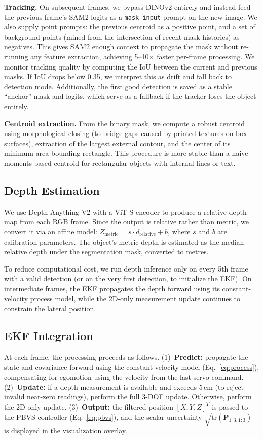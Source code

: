 \documentclass[letterpaper, 10 pt, conference]{ieeeconf}  %
\begin{document}
\textbf{Tracking.}
On subsequent frames, we bypass DINOv2 entirely and instead feed the previous frame's SAM2 logits as a \texttt{mask\_input} prompt on the new image. We also supply point prompts: the previous centroid as a positive point, and a set of background points (mined from the intersection of recent mask histories) as negatives. This gives SAM2 enough context to propagate the mask without re-running any feature extraction, achieving 5--10$\times$ faster per-frame processing. We monitor tracking quality by computing the IoU between the current and previous masks. If IoU drops below 0.35, we interpret this as drift and fall back to detection mode. Additionally, the first good detection is saved as a stable ``anchor'' mask and logits, which serve as a fallback if the tracker loses the object entirely.

\textbf{Centroid extraction.}
From the binary mask, we compute a robust centroid using morphological closing (to bridge gaps caused by printed textures on box surfaces), extraction of the largest external contour, and the center of its minimum-area bounding rectangle. This procedure is more stable than a naive moments-based centroid for rectangular objects with internal lines or text.

\subsection{Depth Estimation}

We use Depth Anything V2 with a ViT-S encoder to produce a relative depth map from each RGB frame. Since the output is relative rather than metric, we convert it via an affine model: $Z_{\text{metric}} = s \cdot d_{\text{relative}} + b$, where $s$ and $b$ are calibration parameters. The object's metric depth is estimated as the median relative depth under the segmentation mask, converted to metres.

To reduce computational cost, we run depth inference only on every 5th frame with a valid detection (or on the very first detection, to initialize the EKF). On intermediate frames, the EKF propagates the depth forward using its constant-velocity process model, while the 2D-only measurement update continues to constrain the lateral position.

\subsection{EKF Integration}

At each frame, the processing proceeds as follows. (1)~\textbf{Predict:} propagate the state and covariance forward using the constant-velocity model (Eq.~\ref{eq:process}), compensating for egomotion using the velocity from the last servo command. (2)~\textbf{Update:} if a depth measurement is available and exceeds 5\,cm (to reject invalid near-zero readings), perform the full 3-DOF update. Otherwise, perform the 2D-only update. (3)~\textbf{Output:} the filtered position $[X, Y, Z]^T$ is passed to the PBVS controller (Eq.~\ref{eq:pbvs}), and the scalar uncertainty $\sqrt{\text{tr}(\mathbf{P}_{1:3,1:3})}$ is displayed in the visualization overlay.
\end{document}
